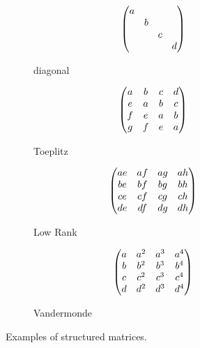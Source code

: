 
\begin{figure}[t]
   \centering
   \begin{subfigure}[t]{0.24\textwidth}
       \centering
       \begin{equation*}
	  \begin{pmatrix}
	    a &   &   &   \\
	      & b &   &   \\
	      &   & c &   \\
	      &   &   & d
	  \end{pmatrix}
       \end{equation*}
       \caption*{diagonal}
   \end{subfigure}
   \hfill
   \begin{subfigure}[t]{0.24\textwidth}
       \centering
       \begin{equation*}
	  \begin{pmatrix}
	    a & b & c & d \\
	    e & a & b & c \\
	    f & e & a & b \\
	    g & f & e & a
	  \end{pmatrix}
       \end{equation*}
       \caption*{Toeplitz}
   \end{subfigure}
   \hfill
   \begin{subfigure}[t]{0.24\textwidth}
       \centering
       \begin{equation*}
	  \begin{pmatrix}
	    ae & af & ag & ah \\
	    be & bf & bg & bh \\
	    ce & cf & cg & ch \\
	    de & df & dg & dh
	  \end{pmatrix}
       \end{equation*}
       \caption*{Low Rank}
   \end{subfigure}
   \hfill
   \begin{subfigure}[t]{0.24\textwidth}
       \centering
       \begin{equation*}
	  \begin{pmatrix}
	    a & a^2 & a^3 & a^4 \\
	    b & b^2 & b^3 & b^4 \\
	    c & c^2 & c^3 & c^4 \\
	    d & d^2 & d^3 & d^4
	  \end{pmatrix}
       \end{equation*}
       \caption*{Vandermonde}
   \end{subfigure}
  \caption{Examples of structured matrices.}
  \label{figure:ch1-example_structure_matrices}
\end{figure}
